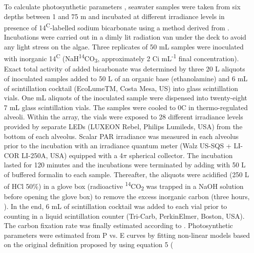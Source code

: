 To calculate photosynthetic parameters \DIFaddbegin {}\DIFaddend , seawater samples were taken from six depths between 1 and 75 m and incubated at different irradiance levels in presence of 14\textsuperscript{C}-labelled sodium bicarbonate using a method derived from \citet{Lewis1983}. Incubations were carried out in a dimly lit radiation van under the deck to avoid any light stress on the algae. Three replicates of 50 mL samples were inoculated with inorganic 14\textsuperscript{C} (NaH\textsuperscript{14}CO\textsubscript{3}, approximately 2 \textmu Ci mL\textsuperscript{-1} final concentration). Exact total activity of added bicarbonate was determined by three 20 \textmu L aliquots of inoculated samples added to 50 \textmu L of an organic base (ethanolamine) and 6 mL of scintillation cocktail (EcoLumeTM, Costa Mesa, US) into glass scintillation vials. One mL aliquots of the inoculated sample were dispensed into twenty-eight 7 mL glass scintillation vials. The samples were cooled to 0\textdegree{}C in thermo-regulated alveoli. Within the array, the vials were exposed to 28 different irradiance levels provided by separate LEDs (LUXEON Rebel, Philips Lumileds, USA) from the bottom of each alveolus. Scalar PAR irradiance was measured in each alveolus prior to the incubation with an irradiance quantum meter (Walz US-SQS + LI-COR LI-250A, USA) equipped with a 4$\pi$ spherical collector. The incubation lasted for 120 minutes and the incubations were terminated by adding with 50 \textmu L of buffered formalin to each sample. \DIFaddbegin {}\DIFaddend Thereafter, the aliquots were acidified (250 \textmu L of HCl 50\%) in a glove box (radioactive \textsuperscript{14}CO\textsubscript{2} was trapped in a NaOH solution before opening the glove box) to remove the excess inorganic carbon (three hours, \citet{Knap1996}). In the end, 6 mL of scintillation cocktail was added to each vial prior to counting in a liquid scintillation counter (Tri-Carb, PerkinElmer, Boston, USA). The carbon fixation rate was finally estimated according to \citet{Parsons1984}. Photosynthetic parameters were estimated from P vs. E curves by fitting non-linear models based on the original definition proposed by \citet{Platt1980} using equation 5 (\DIFdelbegin {}\DIFdelend \DIFaddbegin {}

